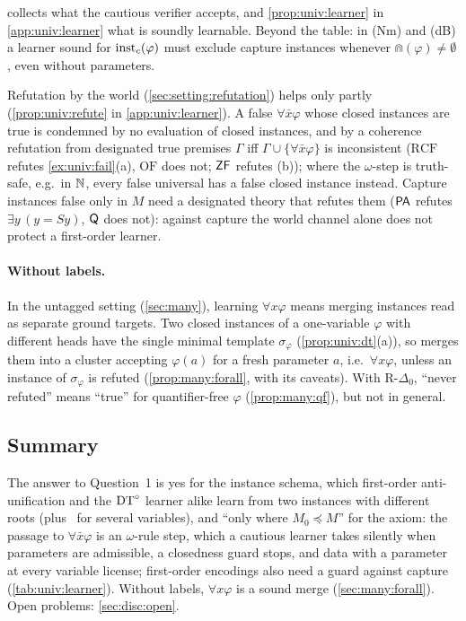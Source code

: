  collects what the cautious verifier accepts, and \cref{prop:univ:learner} in \cref{app:univ:learner} what is soundly learnable. Beyond the table: in (Nm) and (dB) a learner sound for $\mathrm{inst}_{c}(\varphi)$ must exclude capture instances whenever $\Cap(\varphi)\neq\emptyset$, even without parameters.

Refutation by the world (\cref{sec:setting:refutation}) helps only partly (\cref{prop:univ:refute} in \cref{app:univ:learner}). A false $\forall\bar x\varphi$ whose closed instances are true is condemned by no evaluation of closed instances, and by a coherence refutation from designated true premises $\Gamma$ iff $\Gamma\cup\{\forall\bar x\varphi\}$ is inconsistent ($\mathrm{RCF}$ refutes \cref{ex:univ:fail}(a), $\mathrm{OF}$ does not; $\mathsf{ZF}$ refutes (b)); where the $\omega$-step is truth-safe, e.g.\ in $\mathbb{N}$, every false universal has a false closed instance instead. Capture instances false only in $M$ need a designated theory that refutes them ($\mathsf{PA}$ refutes $\exists y\,(y=Sy)$, $\mathsf{Q}$ does not): against capture the world channel alone does not protect a first-order learner.

\paragraph{Without labels.}\label{sec:univ:merge}
In the untagged setting (\cref{sec:many}), learning $\forall x\varphi$ means merging instances read as separate ground targets. Two closed instances of a one-variable $\varphi$ with different heads have the single minimal template $\sigma_\varphi$ (\cref{prop:univ:dt}(a)), so \DTRC{} merges them into a cluster accepting $\varphi(a)$ for a fresh parameter $a$, i.e.\ $\forall x\varphi$, unless an instance of $\sigma_\varphi$ is refuted (\cref{prop:many:forall}, with its caveats). With R-$\Delta_0$, ``never refuted'' means ``true'' for quantifier-free $\varphi$ (\cref{prop:many:qf}), but not in general.

\subsection{Summary}\label{sec:univ:summary}

The answer to Question~1 is yes for the instance schema, which first-order anti-unification and the $\mathrm{DT}^{\circ}$ learner alike learn from two instances with different roots (plus \evD\ for several variables), and ``only where $M_0\preceq M$'' for the axiom: the passage to $\forall\bar x\varphi$ is an $\omega$-rule step, which a cautious learner takes silently when parameters are admissible, a closedness guard stops, and data with a parameter at every variable license; first-order encodings also need a guard against capture (\cref{tab:univ:learner}). Without labels, $\forall x\varphi$ is a sound merge (\cref{sec:many:forall}). Open problems: \cref{sec:disc:open}.
